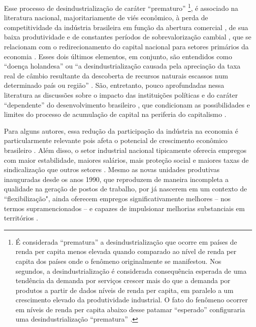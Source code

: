 Esse processo de desindustrialização de caráter ``prematuro''
\citep{rodrik_premature_2016}\footnote{É considerada ``prematura'' a desindustrialização que
  ocorre em países de renda per capita menos elevada quando comparado ao
  nível de renda per capita dos países onde o fenômeno originalmente se
  manifestou. Nos segundos, a desindustrialização é considerada
  consequência esperada de uma tendência da demanda por serviços crescer
  mais do que a demanda por produtos a partir de dados níveis de renda
  per capita, em paralelo a um crescimento elevado da produtividade
  industrial. O fato do fenômeno ocorrer em níveis de renda per capita
  abaixo desse patamar ``esperado'' configuraria uma desindustrialização
  ``prematura''
  \citep{rodrik_premature_2016}.}, é
associado na literatura nacional, majoritariamente de viés econômico, à
perda de competitividade da indústria brasileira em função da abertura
comercial \citep{cano_desindustrializacao_2012}, de sua baixa produtividade
\citep{oreiromarconi2012} e de constantes períodos de sobrevalorização cambial
\citep{marconi_taxa_2012}, que se relacionam com o redirecionamento do capital nacional
para setores primários da economia
\citep{bresserpereira2020,oreiro_desindustrializacao_2010}. Esses dois últimos elementos, em conjunto,
são entendidos como ``doença holandesa'' ou ``a desindustrialização
causada pela apreciação da taxa real de câmbio resultante da descoberta
de recursos naturais escassos num determinado país ou região''
\citep[p.~222]{oreiro_desindustrializacao_2010}. São, entretanto, pouco aprofundadas nessa literatura as
discussões sobre o impacto das instituições políticas e do caráter
``dependente'' do desenvolvimento brasileiro
\citep{evans_dependent_1979}, que
condicionam as possibilidades e limites do processo de acumulação de
capital na periferia do capitalismo
\citep{evans_embedded_1995}.

Para alguns autores, essa redução da participação da indústria na
economia é particularmente relevante pois afeta o potencial de
crescimento econômico brasileiro
\citep{oreiromarconi2012}. Além disso, o setor industrial nacional tipicamente oferecia
empregos com maior estabilidade, maiores salários, mais proteção social
e maiores taxas de sindicalização que outros setores
\citep{ramalho2004}.
Mesmo as novas unidades produtivas inauguradas desde os anos 1990, que
reproduzem de maneira incompleta a qualidade na geração de postos de
trabalho, por já nascerem em um contexto de ``flexibilização", ainda
oferecem empregos significativamente melhores -- nos termos
supramencionados -- e capazes de impulsionar melhorias substanciais em
territórios \citep{ramalho2015}.

